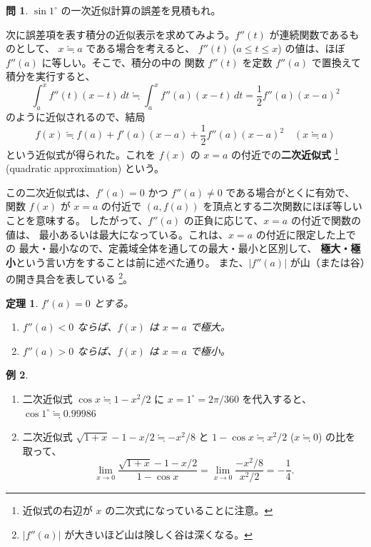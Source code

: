 \documentclass[a4paper]{jsarticle}
\newtheorem{Theorem}{定理}[section]
\theoremstyle{definition}
\newtheorem{Example}[Theorem]{例}
\newtheorem{Exercise}{問}%
\theoremstyle{remark}
\begin{document}
\begin{Exercise}
$\sin 1^\circ$ の一次近似計算の誤差を見積もれ。
\end{Exercise}

次に誤差項を表す積分の近似表示を求めてみよう。$f''(t)$ が連続関数であるものとして、
$x \fallingdotseq a$ である場合を考えると、
$f''(t)$ ($a \leq t \leq x$) の値は、ほぼ $f''(a)$ に等しい。そこで、積分の中の
関数 $f''(t)$ を定数 $f''(a)$ で置換えて積分を実行すると、
\[
\int_a^x f''(t)(x-t)\,dt \fallingdotseq 
\int_a^x f''(a)(x-t)\,dt 
= \frac{1}{2} f''(a) (x-a)^2
\]
のように近似されるので、結局
\[
f(x) \fallingdotseq f(a) + f'(a)(x-a) + \frac{1}{2} f''(a) (x-a)^2
\quad 
(x \fallingdotseq a)
\]
という近似式が得られた。これを $f(x)$ の $x=a$ の付近での\textbf{二次近似式} 
\footnote{近似式の右辺が $x$ の二次式になっていることに注意。}
(quadratic approximation) という。

この二次近似式は、$f'(a) = 0$ かつ $f''(a) \not= 0$ である場合がとくに有効で、
関数 $f(x)$ が $x=a$ の付近で $(a,f(a))$ を頂点とする二次関数にほぼ等しいことを意味する。
したがって、$f''(a)$ の正負に応じて、$x=a$ の付近で関数の値は、
最小あるいは最大になっている。これは、$x=a$ の付近に限定した上での
最大・最小なので、定義域全体を通しての最大・最小と区別して、
{\bf 極大・極小}という言い方をすることは前に述べた通り。
また、$|f''(a)|$ が山（または谷）の開き具合を表している
\footnote{$|f''(a)|$ が大きいほど山は険しく谷は深くなる。}。

\begin{figure}[htbp]
  \begin{center}

\end{center}
\caption{}
\end{figure}

\begin{Theorem} 
$f'(a) = 0$ とする。
\begin{enumerate}
\item
$f''(a) <0$ ならば、$f(x)$ は $x=a$ で極大。
\item
$f''(a) > 0$ ならば、$f(x)$ は $x=a$ で極小。
\end{enumerate}
\end{Theorem}

\medskip
\begin{Example}~ 
  \begin{enumerate}
  \item 
二次近似式 $\cos x \fallingdotseq 1 - x^2/2$ に $x= 1^\circ = 2\pi/360$ を代入すると、
$\cos 1^\circ \fallingdotseq 0.99986$
\item 
二次近似式 $\sqrt{1+x} - 1 - x/2 \fallingdotseq - x^2/8$ と 
$1 - \cos x \fallingdotseq x^2/2$ ($x \fallingdotseq 0$) の比を取って、
\[
\lim_{x \to 0} \frac{\sqrt{1+x} - 1 - x/2}{1 - \cos x} = 
\lim_{x \to 0} \frac{-x^2/8}{x^2/2} = - \frac{1}{4}. 
\]
  \end{enumerate}
\end{Example}
\end{document}
